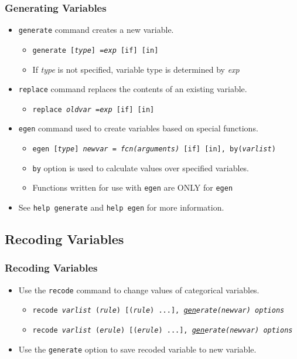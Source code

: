\documentclass{beamer}
\begin{document}
\begin{frame}
	\frametitle{Generating Variables}
		\begin{itemize}
			\item \texttt{\underline{g}enerate} command creates a new variable.
				\begin{itemize}
					\item \texttt{generate [\textit{type}] =\textit{exp} [if] [in]}
					\item If \textit{type} is not specified, variable type is determined by \textit{exp}
				\end{itemize}
			\item \texttt{replace} command replaces the contents of an existing variable.
				\begin{itemize}
					\item \texttt{replace \textit{oldvar} =\textit{exp} [if] [in]}
				\end{itemize}
			\item \texttt{egen} command used to create variables based on special functions.
				\begin{itemize}
					\item \texttt{egen [\textit{type}] \textit{newvar} = \textit{fcn(arguments)} [if] [in], by(\textit{varlist})}
					\item \texttt{by} option is used to calculate values over specified variables.
					\item Functions written for use with \texttt{egen} are ONLY for \texttt{egen}
				\end{itemize}
			\item See \texttt{help generate} and \texttt{help egen} for more information.
		\end{itemize}
\end{frame}

\subsection{Recoding Variables}

\begin{frame}
	\frametitle{Recoding Variables}
		\begin{itemize}
			\item Use the \texttt{recode} command to change values of categorical variables.
				\begin{itemize}
					\item \texttt{recode \textit{varlist} (\textit{rule}) [(\textit{rule}) ...], \textit{\underline{gen}erate(\textit{newvar}) options}}
					\item \texttt{recode \textit{varlist} (\textit{erule}) [(\textit{erule}) ...], \textit{\underline{gen}erate(\textit{newvar}) options}}
				\end{itemize}
			\item Use the \texttt{generate} option to save recoded variable to new variable.
		\end{itemize}
\end{frame}
\end{document}
